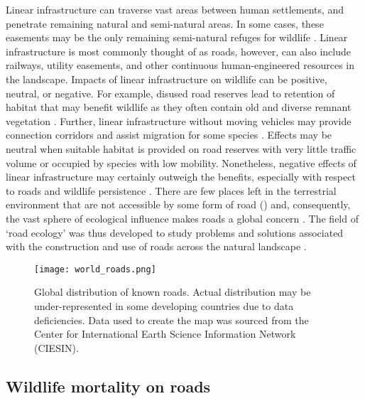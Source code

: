 Linear infrastructure can traverse vast areas between human settlements, and penetrate remaining natural and semi-natural areas. In some cases, these easements may be the only remaining semi-natural refuges for wildlife \citep{benn91}. Linear infrastructure is most commonly thought of as roads, however, can also include railways, utility easements, and other continuous human-engineered resources in the landscape. Impacts of linear infrastructure on wildlife can be positive, neutral, or negative. For example, disused road reserves lead to retention of habitat that may benefit wildlife as they often contain old and diverse remnant vegetation \citep{lent11}. Further, linear infrastructure without moving vehicles may provide connection corridors and assist migration for some species \citep{rvdr15}. Effects may be neutral when suitable habitat is provided on road reserves with very little traffic volume or occupied by species with low mobility. Nonetheless, negative effects of linear infrastructure may certainly outweigh the benefits, especially with respect to roads and wildlife persistence \citep{fahr09}. There are few places left in the terrestrial environment that are not accessible by some form of road () and, consequently, the vast sphere of ecological influence makes roads a global concern \citep{laur14}. The field of `road ecology' was thus developed to study problems and solutions associated with the construction and use of roads across the natural landscape \citep{form03,rvdr15}. 

\begin{figure*}[!t]
  \centering
  \texttt{[image: world\_roads.png]}
  \caption[Global distribution of known roads]{Global distribution of known roads. Actual distribution may be under-represented in some developing countries due to data deficiencies. Data used to create the map was sourced from the Center for International Earth Science Information Network (CIESIN).}
  \label{roads}
\end{figure*}

\subsection{Wildlife mortality on roads}

